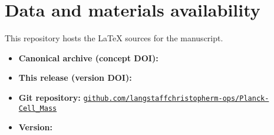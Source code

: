 \section*{Data and materials availability}
This repository hosts the \LaTeX{} sources for the manuscript.

\begin{itemize}
  \item \textbf{Canonical archive (concept DOI):}
  \href{https://doi.org/\RepoConceptDOI}{\RepoConceptDOI}

  \item \textbf{This release (version DOI):}
  \href{https://doi.org/\PaperDOI}{\PaperDOI}

  \item \textbf{Git repository:}
  \href{\RepoGitHubURL}{\texttt{github.com/langstaffchristopherm-ops/Planck-Cell\_Mass}}

  \item \textbf{Version:} \PaperVersion
\end{itemize}
